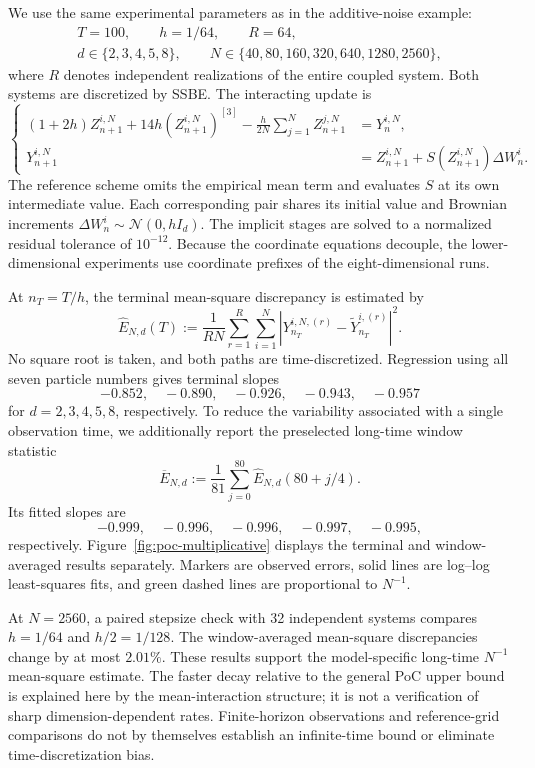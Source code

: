 We use the same experimental parameters as in the additive-noise example:
\[
\begin{gathered}
    T=100,\qquad h=1/64,\qquad R=64,\\
    d\in\{2,3,4,5,8\},\qquad
    N\in\{40,80,160,320,640,1280,2560\},
\end{gathered}
\]
where \(R\) denotes independent realizations of the entire coupled system.
Both systems are discretized by SSBE. The interacting update is
\[
\left\{
\begin{aligned}
    (1+2h)Z_{n+1}^{i,N}
    +14h(Z_{n+1}^{i,N})^{[3]}
    -\frac h{2N}\sum_{j=1}^NZ_{n+1}^{j,N}
    &=Y_n^{i,N},\\
    Y_{n+1}^{i,N}
    &=Z_{n+1}^{i,N}+S(Z_{n+1}^{i,N})\Delta W_n^i.
\end{aligned}
\right.
\]
The reference scheme omits the empirical mean term and evaluates
\(S\) at its own intermediate value. Each corresponding pair shares
its initial value and Brownian increments
\(\Delta W_n^i\sim\mathcal N(0,hI_d)\). The implicit stages are solved
to a normalized residual tolerance of \(10^{-12}\).
Because the coordinate equations decouple, the lower-dimensional
experiments use coordinate prefixes of the eight-dimensional runs.

At \(n_T=T/h\), the terminal mean-square discrepancy is estimated by
\begin{equation}
\label{eq:poc-multiplicative-error}
    \widehat E_{N,d}(T)
    :=
    \frac1{RN}\sum_{r=1}^R\sum_{i=1}^N
    \left|Y_{n_T}^{i,N,(r)}-\widetilde Y_{n_T}^{i,(r)}\right|^2.
\end{equation}
No square root is taken, and both paths are time-discretized.
Regression using all seven particle numbers gives terminal slopes
\[
    -0.852,\quad -0.890,\quad -0.926,\quad -0.943,\quad -0.957
\]
for \(d=2,3,4,5,8\), respectively.
To reduce the variability associated with a single observation time,
we additionally report the preselected long-time window statistic
\[
    \overline E_{N,d}
    :=\frac1{81}\sum_{j=0}^{80}
    \widehat E_{N,d}(80+j/4).
\]
Its fitted slopes are
\[
    -0.999,\quad -0.996,\quad -0.996,\quad -0.997,\quad -0.995,
\]
respectively. Figure~\ref{fig:poc-multiplicative} displays the terminal
and window-averaged results separately. Markers are observed errors,
solid lines are log--log least-squares fits, and green dashed lines
are proportional to \(N^{-1}\).

At \(N=2560\), a paired stepsize check with 32 independent systems
compares \(h=1/64\) and \(h/2=1/128\). The window-averaged
mean-square discrepancies change by at most \(2.01\%\).
These results support the model-specific long-time \(N^{-1}\)
mean-square estimate. The faster decay relative to the general
PoC upper bound is explained here by the mean-interaction structure;
it is not a verification of sharp dimension-dependent rates.
Finite-horizon observations and reference-grid comparisons do not
by themselves establish an infinite-time bound or eliminate
time-discretization bias.

